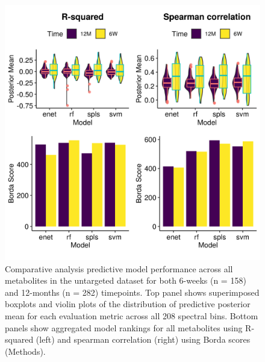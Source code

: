 \begin{figure}[!h]
    \centering
    \includegraphics[width=0.95\linewidth]{figures/appB_fs3.png}
    \caption[Comparative analysis predictive model performance across all metabolites in the untargeted dataset for both 6-weeks (n = 158) and 12-months (n = 282) timepoints.]{Comparative analysis predictive model performance across all metabolites in the untargeted dataset for both 6-weeks (n = 158) and 12-months (n = 282) timepoints. Top panel shows superimposed boxplots and violin plots of the distribution of predictive posterior mean for each evaluation metric across all 208 spectral bins. Bottom panels show aggregated model rankings for all metabolites using R-squared (left) and spearman correlation (right) using Borda scores (Methods).}
    \label{fig:b3}
\end{figure}

